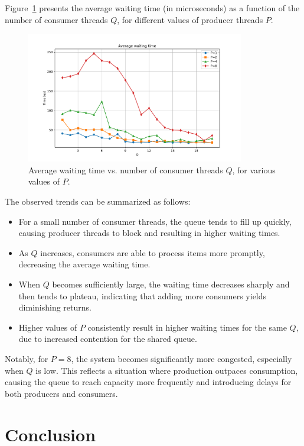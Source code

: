 \documentclass[11pt]{article}
\begin{document}
Figure~\ref{fig:avg_waiting_time} presents the average waiting time (in microseconds) as a function of the number of consumer threads \( Q \), for different values of producer threads \( P \).

\begin{figure}[H]
    \centering
    \includegraphics[width=0.85\textwidth]{figure.pdf}
    \caption{Average waiting time vs. number of consumer threads \( Q \), for various values of \( P \).}
    \label{fig:avg_waiting_time}
\end{figure}

The observed trends can be summarized as follows:
\begin{itemize}
    \item For a small number of consumer threads, the queue tends to fill up quickly, causing producer threads to block and resulting in higher waiting times.
    \item As \( Q \) increases, consumers are able to process items more promptly, decreasing the average waiting time.
    \item When \( Q \) becomes sufficiently large, the waiting time decreases sharply and then tends to plateau, indicating that adding more consumers yields diminishing returns.
    \item Higher values of \( P \) consistently result in higher waiting times for the same \( Q \), due to increased contention for the shared queue.
\end{itemize}

Notably, for \( P = 8 \), the system becomes significantly more congested, especially when \( Q \) is low. This reflects a situation where production outpaces consumption, causing the queue to reach capacity more frequently and introducing delays for both producers and consumers.

\section{Conclusion}
\end{document}
